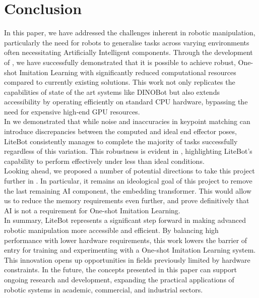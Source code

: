 \chapter{Conclusion}
\label{chap:conclusion}

In this paper, we have addressed the challenges inherent in robotic manipulation, particularly the need for robots to generalise tasks across varying environments often necessitating Artificially Intelligent components. Through the development of , we have successfully demonstrated that it is possible to achieve robust, One-shot Imitation Learning with significantly reduced computational resources compared to currently existing solutions. This work not only replicates the capabilities of state of the art systems like DINOBot \cite{one-shot-imitation} but also extends accessibility by operating efficiently on standard CPU hardware, bypassing the need for expensive high-end GPU resources.\\

In  we demonstrated that while noise and inaccuracies in keypoint matching can introduce discrepancies between the computed and ideal end effector poses, LiteBot consistently manages to complete the majority of tasks successfully regardless of this variation. This robustness is evident in , highlighting LiteBot's capability to perform effectively under less than ideal conditions.\\

Looking ahead, we proposed a number of potential directions to take this project further in . In particular, it remains an ideological goal of this project to remove the last remaining AI component, the embedding transformer. This would allow us to reduce the memory requirements even further, and prove definitively that AI is not a requirement for One-shot Imitation Learning.\\


In summary, LiteBot represents a significant step forward in making advanced robotic manipulation more accessible and efficient. By balancing high performance with lower hardware requirements, this work lowers the barrier of entry for training and experimenting with a One-shot Imitation Learning system. This innovation opens up opportunities in fields previously limited by hardware constraints. In the future, the concepts presented in this paper can support ongoing research and development, expanding the practical applications of robotic systems in academic, commercial, and industrial sectors.